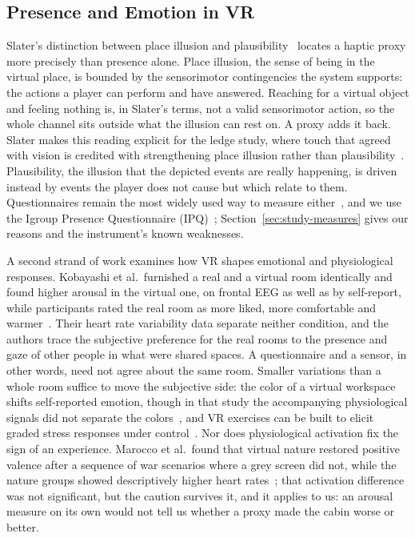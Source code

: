 
\subsection{Presence and Emotion in VR}
\label{sec:rw-presence-emotion}

Slater's distinction between place illusion and plausibility~\cite{Slater.2009} locates a haptic proxy more precisely than presence alone. Place illusion, the sense of being in the virtual place, is bounded by the sensorimotor contingencies the system supports: the actions a player can perform and have answered. Reaching for a virtual object and feeling nothing is, in Slater's terms, not a valid sensorimotor action, so the whole channel sits outside what the illusion can rest on. A proxy adds it back. Slater makes this reading explicit for the ledge study, where touch that agreed with vision is credited with strengthening place illusion rather than plausibility~\cite{Slater.2009,Meehan.2002}. Plausibility, the illusion that the depicted events are really happening, is driven instead by events the player does not cause but which relate to them.  Questionnaires remain the most widely used way to measure either~\cite{Grassini.2020}, and we use the Igroup Presence Questionnaire (IPQ)~\cite{Schubert.2001, Schubert.2003}; Section~\ref{sec:study-measures} gives our reasons and the instrument's known weaknesses.

A second strand of work examines how VR shapes emotional and physiological responses. 
Kobayashi et al.\ furnished a real and a virtual room identically and found higher arousal in the
virtual one, on frontal EEG as well as by self-report, while participants rated the real room as more liked, more comfortable and warmer~\cite{Kobayashi.2025}.
Their heart rate variability data separate neither condition, and the authors
trace the subjective preference for the real rooms to the presence and gaze of
other people in what were shared spaces. A questionnaire and a sensor, in other
words, need not agree about the same room. Smaller variations than a whole room
suffice to move the subjective side: the color of a virtual workspace shifts
self-reported emotion, though in that study the accompanying physiological
signals did not separate the colors~\cite{Zhang.2025}, and VR exercises can be
built to elicit graded stress responses under
control~\cite{Khundrakpam.2025}. Nor does physiological activation fix the sign
of an experience. Marocco et al.\ found that virtual nature restored positive
valence after a sequence of war scenarios where a grey screen did not, while the
nature groups showed descriptively higher heart rates~\cite{Marocco.2025}; that
activation difference was not significant, but the caution survives it, and it
applies to us: an arousal measure on its own would not tell us whether a proxy
made the cabin worse or better.

